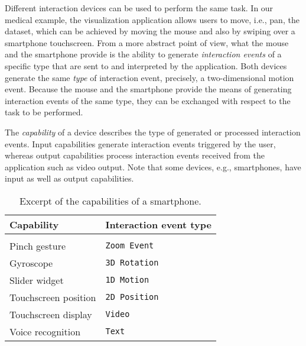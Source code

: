 \documentclass[twoside,twocolumn,10pt]{article}
\begin{document}
%
%
Different interaction devices can be used to perform the same task. In our medical example, the visualization application allows users to move, i.e., pan, the dataset, which can be achieved by moving the mouse and also by swiping over a smartphone touchscreen. From a more abstract point of view, what the mouse and the smartphone provide is the ability to generate \emph{interaction events} of a specific type that are sent to and interpreted by the application. Both devices generate the same \emph{type} of interaction event, precisely, a two-dimensional motion event. Because the mouse and the smartphone provide the means of generating interaction events of the same type, they can be exchanged with respect to the task to be performed.

The \emph{capability} of a device describes the type of generated or processed interaction events. Input capabilities generate interaction events triggered by the user, whereas output capabilities process interaction events received from the application such as video output. Note that some devices, e.g., smartphones, have input as well as output capabilities.

\begin{table}[htb]
\small
\centering

\begin{tabular}{l|l}
Capability & Interaction event type \\
\hline \\[-1.0em]
Pinch gesture & \texttt{Zoom Event} \\
Gyroscope & \texttt{3D Rotation} \\
Slider widget & \texttt{1D Motion} \\
Touchscreen position & \texttt{2D Position} \\
Touchscreen display & \texttt{Video} \\
Voice recognition & \texttt{Text}
\end{tabular}
\caption{Excerpt of the capabilities of a smartphone.}
\label{tab:smartphonecap}
\end{table}
\end{document}
